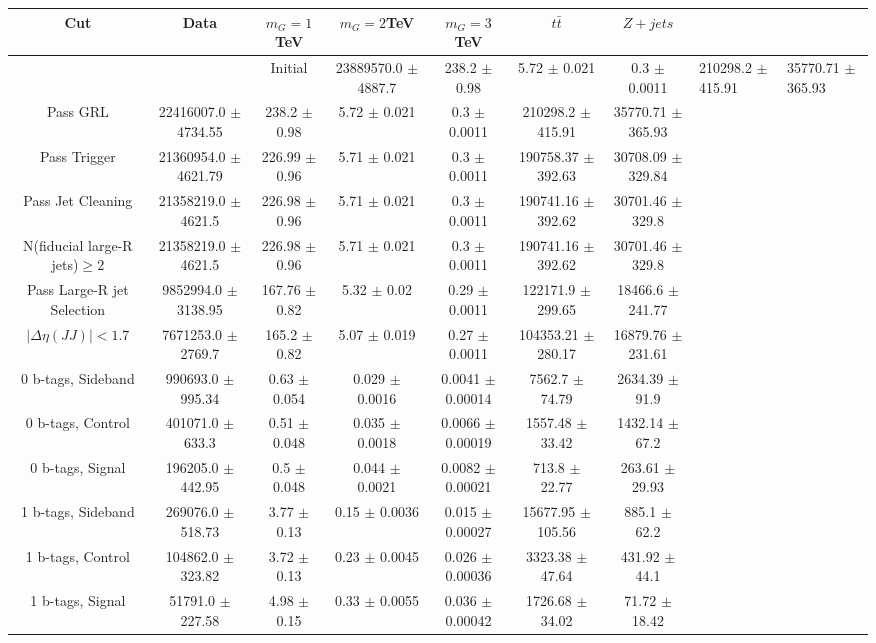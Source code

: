 \begin{footnotesize} 
\begin{tabular}{c|c|c|c|c|c|c} 
Cut & Data & $m_{G}=1$TeV & $m_{G}=2$TeV & $m_{G}=3$TeV & $t\bar{t}$ & $Z+jets$ \\ 
\hline\hline 
& &  
Initial & 23889570.0 $\pm$ 4887.7 & 238.2 $\pm$ 0.98 & 5.72 $\pm$ 0.021 & 0.3 $\pm$ 0.0011 & 210298.2 $\pm$ 415.91 & 35770.71 $\pm$ 365.93\\ 
Pass GRL & 22416007.0 $\pm$ 4734.55 & 238.2 $\pm$ 0.98 & 5.72 $\pm$ 0.021 & 0.3 $\pm$ 0.0011 & 210298.2 $\pm$ 415.91 & 35770.71 $\pm$ 365.93\\ 
Pass Trigger & 21360954.0 $\pm$ 4621.79 & 226.99 $\pm$ 0.96 & 5.71 $\pm$ 0.021 & 0.3 $\pm$ 0.0011 & 190758.37 $\pm$ 392.63 & 30708.09 $\pm$ 329.84\\ 
Pass Jet Cleaning & 21358219.0 $\pm$ 4621.5 & 226.98 $\pm$ 0.96 & 5.71 $\pm$ 0.021 & 0.3 $\pm$ 0.0011 & 190741.16 $\pm$ 392.62 & 30701.46 $\pm$ 329.8\\ 
N(fiducial large-R jets)$\geq 2$ & 21358219.0 $\pm$ 4621.5 & 226.98 $\pm$ 0.96 & 5.71 $\pm$ 0.021 & 0.3 $\pm$ 0.0011 & 190741.16 $\pm$ 392.62 & 30701.46 $\pm$ 329.8\\ 
Pass Large-R jet Selection & 9852994.0 $\pm$ 3138.95 & 167.76 $\pm$ 0.82 & 5.32 $\pm$ 0.02 & 0.29 $\pm$ 0.0011 & 122171.9 $\pm$ 299.65 & 18466.6 $\pm$ 241.77\\ 
$|\Delta\eta(JJ)|<1.7$ & 7671253.0 $\pm$ 2769.7 & 165.2 $\pm$ 0.82 & 5.07 $\pm$ 0.019 & 0.27 $\pm$ 0.0011 & 104353.21 $\pm$ 280.17 & 16879.76 $\pm$ 231.61\\ 
0 b-tags, Sideband & 990693.0 $\pm$ 995.34 & 0.63 $\pm$ 0.054 & 0.029 $\pm$ 0.0016 & 0.0041 $\pm$ 0.00014 & 7562.7 $\pm$ 74.79 & 2634.39 $\pm$ 91.9\\ 
0 b-tags, Control & 401071.0 $\pm$ 633.3 & 0.51 $\pm$ 0.048 & 0.035 $\pm$ 0.0018 & 0.0066 $\pm$ 0.00019 & 1557.48 $\pm$ 33.42 & 1432.14 $\pm$ 67.2\\ 
0 b-tags, Signal & 196205.0 $\pm$ 442.95 & 0.5 $\pm$ 0.048 & 0.044 $\pm$ 0.0021 & 0.0082 $\pm$ 0.00021 & 713.8 $\pm$ 22.77 & 263.61 $\pm$ 29.93\\ 
1 b-tags, Sideband & 269076.0 $\pm$ 518.73 & 3.77 $\pm$ 0.13 & 0.15 $\pm$ 0.0036 & 0.015 $\pm$ 0.00027 & 15677.95 $\pm$ 105.56 & 885.1 $\pm$ 62.2\\ 
1 b-tags, Control & 104862.0 $\pm$ 323.82 & 3.72 $\pm$ 0.13 & 0.23 $\pm$ 0.0045 & 0.026 $\pm$ 0.00036 & 3323.38 $\pm$ 47.64 & 431.92 $\pm$ 44.1\\ 
1 b-tags, Signal & 51791.0 $\pm$ 227.58 & 4.98 $\pm$ 0.15 & 0.33 $\pm$ 0.0055 & 0.036 $\pm$ 0.00042 & 1726.68 $\pm$ 34.02 & 71.72 $\pm$ 18.42\\ 

\end{tabular}
\end{footnotesize}
